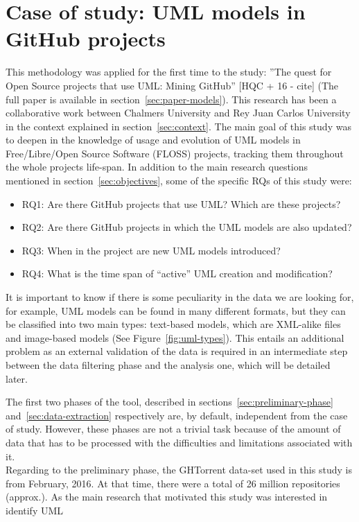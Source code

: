 \documentclass[a4paper, 12pt]{book}
\begin{document}
\section{Case of study: UML models in GitHub projects}
\label{sec:case-study-uml}
This methodology was applied for the first time to the study: ”The quest for Open Source projects that use
UML: Mining GitHub” [HQC + 16 - cite] (The full paper is available in section~\ref{sec:paper-models}).
This research has been a collaborative work between Chalmers University and Rey Juan Carlos University in the context
explained in section~\ref{sec:context}.
The main goal of this study was to deepen in the knowledge of usage and evolution of UML models in
Free/Libre/Open Source Software (FLOSS) projects, tracking them throughout the whole projects life-span.
In addition to the main research questions mentioned in section~\ref{sec:objectives}, some of the specific RQs
of this study were:
\begin{itemize}
  \item RQ1: Are there GitHub projects that use UML? Which are these projects?
  \item RQ2: Are there GitHub projects in which the UML models are also updated?
  \item RQ3: When in the project are new UML models introduced?
  \item RQ4: What is the time span of ``active'' UML creation and modification?
\end{itemize}
It is important to know if there is some peculiarity in the data we are looking for, for example, UML models can be
found in many different formats, but they can be classified into two main types: text-based models, which are XML-alike
files and image-based models (See Figure~\ref{fig:uml-types}). This entails an additional problem as an external validation of the data is
required in an intermediate step between the data filtering phase and the analysis one, which will be detailed later.\par
The first two phases of the tool, described in sections~\ref{sec:preliminary-phase} and~\ref{sec:data-extraction} respectively
are, by default, independent from the case of study. However, these phases are not a trivial task because of the amount of
data that has to be processed with the difficulties and limitations associated with it.\\
Regarding to the preliminary phase, the GHTorrent data-set used in this study is from February, 2016. At that time, there were
a total of 26 million repositories (approx.). As the main research that motivated this study was interested in identify UML
\end{document}
